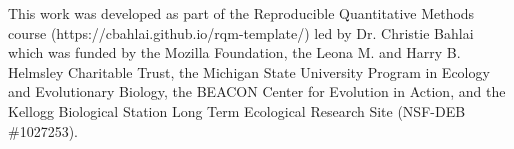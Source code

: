 \documentclass[journal abbreviations, manuscript]{copernicus}
\begin{document}



\begin{acknowledgements}
  This work was developed as part of the Reproducible Quantitative Methods course (https://cbahlai.github.io/rqm-template/) led by Dr. Christie Bahlai which was funded by the Mozilla Foundation, the Leona M. and Harry B. Helmsley Charitable Trust, the Michigan State University Program in Ecology and Evolutionary Biology, the BEACON Center for Evolution in Action, and the Kellogg Biological Station Long Term Ecological Research Site (NSF-DEB \#1027253).
\end{acknowledgements}




% 
% 
% 





\end{document}
